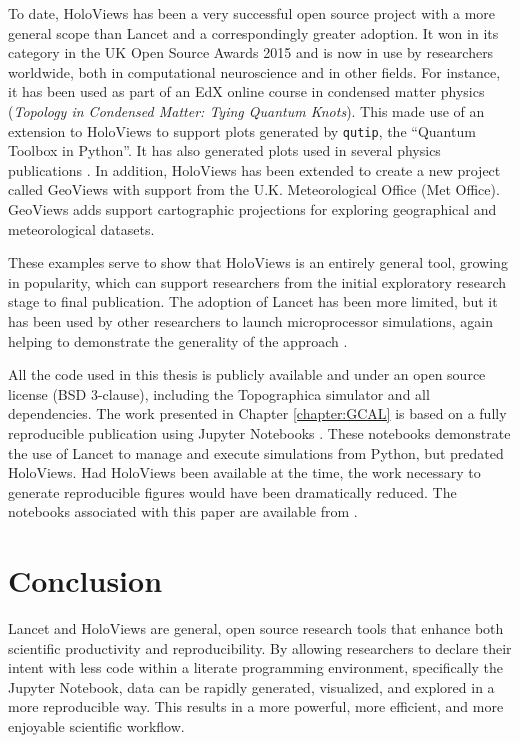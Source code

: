 \documentclass[phd,ianc,twoside]{infthesis}
\begin{document}
To date, HoloViews has been a very successful open source project with a
more general scope than Lancet and a correspondingly greater
adoption. It won in its category in the UK Open Source Awards 2015 and
is now in use by researchers worldwide, both in computational
neuroscience and in other fields. For instance, it has been used as
part of an EdX online course in 
condensed matter physics (\emph{Topology in Condensed Matter: Tying Quantum
Knots}). This made use of an extension to HoloViews to support plots
generated by \texttt{qutip}, the ``Quantum Toolbox in Python''.
It has also generated plots used in several physics publications
\citep{nijholt_arxiv15,tenner_apchd16}. 
In addition, HoloViews has been extended to create a new project called
GeoViews with support from the U.K. Meteorological Office (Met
Office).  GeoViews adds support cartographic projections for exploring
geographical and meteorological datasets.

These examples serve to show
that HoloViews is an entirely general tool, growing in popularity, which
can support researchers from the initial exploratory research stage to
final publication. The adoption of Lancet has been more limited, but it
has been used by other researchers to launch microprocessor simulations,
again helping to demonstrate the generality of the approach
\citep{elver_hpca14}.

All the code used in this thesis is publicly available and under an open
source license (BSD 3-clause), including the Topographica simulator and
all dependencies. The work presented in Chapter \ref{chapter:GCAL} is
based on a fully reproducible publication using Jupyter Notebooks
\citep{stevens_jn13}. These notebooks demonstrate the use of Lancet to
manage and execute simulations from Python, but predated HoloViews. Had
HoloViews been available at the time, the work necessary to generate
reproducible figures would have been dramatically reduced. The notebooks
associated with this paper are available from .


\section{Conclusion}

Lancet and HoloViews are general, open source research tools that
enhance both scientific productivity and reproducibility. By allowing
researchers to declare their intent with less code within a literate
programming environment, specifically the Jupyter Notebook, data can be
rapidly generated, visualized, and explored in a more reproducible
way. This results in a more powerful, more efficient, and more enjoyable
scientific workflow.
\end{document}
